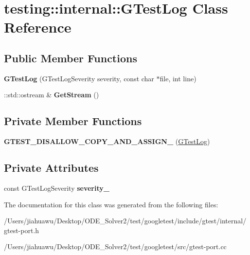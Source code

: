 \hypertarget{classtesting_1_1internal_1_1_g_test_log}{}\section{testing\+:\+:internal\+:\+:G\+Test\+Log Class Reference}
\label{classtesting_1_1internal_1_1_g_test_log}
\subsection*{Public Member Functions}
\begin{DoxyCompactItemize}
\item 
\mbox{\label{classtesting_1_1internal_1_1_g_test_log_a364691bf972983a59cfa2891062a64af}} 
{\bfseries G\+Test\+Log} (G\+Test\+Log\+Severity severity, const char $\ast$file, int line)
\item 
\mbox{\label{classtesting_1_1internal_1_1_g_test_log_aebb92e67d98eca69f0347d5121dab27a}} 
\+::std\+::ostream \& {\bfseries Get\+Stream} ()
\end{DoxyCompactItemize}
\subsection*{Private Member Functions}
\begin{DoxyCompactItemize}
\item 
\mbox{\label{classtesting_1_1internal_1_1_g_test_log_ab6032a126d36a80163fdcd406fce3aad}} 
{\bfseries G\+T\+E\+S\+T\+\_\+\+D\+I\+S\+A\+L\+L\+O\+W\+\_\+\+C\+O\+P\+Y\+\_\+\+A\+N\+D\+\_\+\+A\+S\+S\+I\+G\+N\+\_\+} (\mbox{\hyperlink{classtesting_1_1internal_1_1_g_test_log}{G\+Test\+Log}})
\end{DoxyCompactItemize}
\subsection*{Private Attributes}
\begin{DoxyCompactItemize}
\item 
\mbox{\label{classtesting_1_1internal_1_1_g_test_log_ad8f75f5845900d0d2fd3cbb048a861be}} 
const G\+Test\+Log\+Severity {\bfseries severity\+\_\+}
\end{DoxyCompactItemize}


The documentation for this class was generated from the following files\+:\begin{DoxyCompactItemize}
\item 
/\+Users/jiahuawu/\+Desktop/\+O\+D\+E\+\_\+\+Solver2/test/googletest/include/gtest/internal/gtest-\/port.\+h\item 
/\+Users/jiahuawu/\+Desktop/\+O\+D\+E\+\_\+\+Solver2/test/googletest/src/gtest-\/port.\+cc\end{DoxyCompactItemize}
